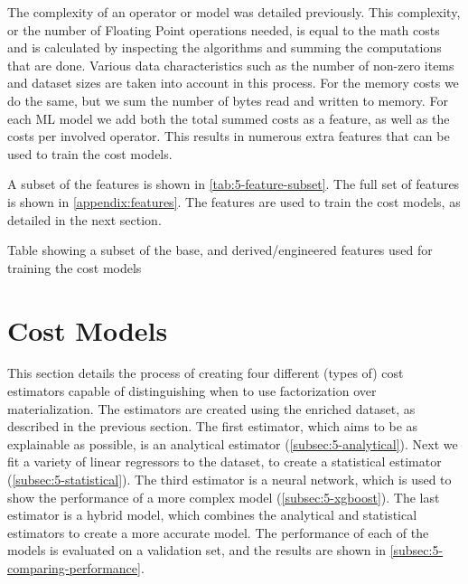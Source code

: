 The complexity of an operator or model was detailed previously. This complexity, or the number of Floating Point operations needed, is equal to the math costs and is calculated by inspecting the algorithms and summing the computations that are done. Various data characteristics such as the number of non-zero items and dataset sizes are taken into account in this process. For the memory costs we do the same, but we sum the number of bytes read and written to memory. For each ML model we add both the total summed costs as a feature, as well as the costs per involved operator. This results in numerous extra features that can be used to train the cost models.

A subset of the features is shown in \autoref{tab:5-feature-subset}. The full set of features is shown in \autoref{appendix:features}. The features are used to train the cost models, as detailed in the next section.

\begin{table}[ht]
    
    \caption[Feature table]{Table showing a subset of the base, and derived/engineered features used for training the cost models}
    \label{tab:5-feature-subset}
\end{table}



\section{Cost Models}
\label{sec:5-cost-models}
This section details the process of creating four different (types of) cost estimators capable of distinguishing when to use factorization over materialization. The estimators are created using the enriched dataset, as described in the previous section. The first estimator, which aims to be as explainable as possible, is an analytical estimator (\autoref{subsec:5-analytical}). Next we fit a variety of linear regressors to the dataset, to create a statistical estimator (\autoref{subsec:5-statistical}). The third estimator is a neural network, which is used to show the performance of a more complex model (\autoref{subsec:5-xgboost}). The last estimator is a hybrid model, which combines the analytical and statistical estimators to create a more accurate model. The performance of each of the models is evaluated on a validation set, and the results are shown in \autoref{subsec:5-comparing-performance}.

